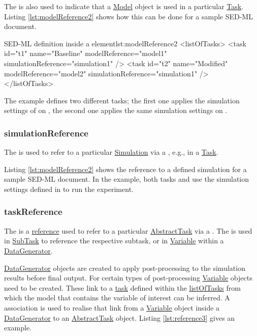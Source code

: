 The  is also used to indicate that a \hyperref[class:model]{Model} object is used in a particular  \hyperref[class:task]{Task}. Listing \ref{lst:modelReference2} shows how this can be done for a sample SED-ML document.

\begin{myXmlLst}{SED-ML  definition inside a  element}{lst:modelReference2}
<listOfTasks>
	<task id="t1" name="Baseline" modelReference="model1" simulationReference="simulation1" />
	<task id="t2" name="Modified" modelReference="model2" simulationReference="simulation1" />
</listOfTasks>
\end{myXmlLst}

The example defines two different tasks; the first one applies the simulation settings of  on , the second one applies the same simulation settings on .


\subsubsection{simulationReference}
\label{sec:simulationReference}
The  is used to refer to a particular \hyperref[class:simulation]{Simulation}  via a \hyperref[type:sidref]{}, e.g., in a \hyperref[class:task]{Task}. 

Listing \ref{lst:modelReference2} shows the reference to a defined simulation for a sample SED-ML document. In the example, both tasks  and  use the simulation settings defined in  to run the experiment.


\subsubsection{taskReference}
\label{sec:taskReference}
The  is a \hyperref[sec:reference]{reference} used to refer to a particular \hyperref[class:abstractTask]{AbstractTask} via a \hyperref[type:sidref]{}. The  is used in \hyperref[class:subTask]{SubTask} to reference the respective subtask, or in \hyperref[class:variable]{Variable} within a \hyperref[class:dataGenerator]{DataGenerator}.

\hyperref[class:dataGenerator]{DataGenerator} objects are created to apply post-processing to the simulation results before final output. 
For certain types of post-processing \hyperref[class:variable]{Variable} objects need to be created.
These link to a \hyperref[class:abstractTask]{task} defined within the \hyperref[sec:listOfTasks]{listOfTasks} from which the model that contains the variable of interest can be inferred. A  association is used to realise that link from a \hyperref[class:variable]{Variable} object inside a \hyperref[class:dataGenerator]{DataGenerator} to an \hyperref[class:abstractTask]{AbstractTask} object. Listing \ref{lst:reference3} gives an example.

